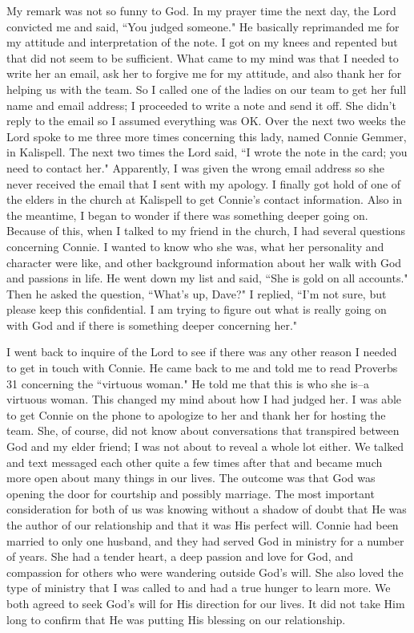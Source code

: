 \documentclass[oneside,12pt]{book}
\begin{document}
My remark was not so funny to God. In my prayer time the next day, the Lord convicted me and said, ``You judged someone." He basically reprimanded me for my attitude and interpretation of the note. I got on my knees and repented but that did not seem to be sufficient. What came to my mind was that I needed to write her an email, ask her to forgive me for my attitude, and also thank her for helping us with the team. So I called one of the ladies on our team to get her full name and email address; I proceeded to write a note and send it off. She didn't reply to the email so I assumed everything was OK. Over the next two weeks the Lord spoke to me three more times concerning this lady, named Connie Gemmer, in Kalispell. The next two times the Lord said, ``I wrote the note in the card; you need to contact her." Apparently, I was given the wrong email address so she never received the email that I sent with my apology. I finally got hold of one of the elders in the church at Kalispell to get Connie's contact information. Also in the meantime, I began to wonder if there was something deeper going on. Because of this, when I talked to my friend in the church, I had several questions concerning Connie. I wanted to know who she was, what her personality and character were like, and other background information about her walk with God and passions in life. He went down my list and said, ``She is gold on all accounts." Then he asked the question, ``What's up, Dave?" I replied, ``I'm not sure, but please keep this confidential. I am trying to figure out what is really going on with God and if there is something deeper concerning her." 

I went back to inquire of the Lord to see if there was any other reason I needed to get in touch with Connie. He came back to me and told me to read Proverbs 31 concerning the ``virtuous woman." He told me that this is who she is--a virtuous woman. This changed my mind about how I had judged her. I was able to get Connie on the phone to apologize to her and thank her for hosting the team. She, of course, did not know about  conversations that transpired between God and my elder friend; I was not about to reveal a whole lot either. We talked and text messaged each other quite a few times after that and became much more open about many things in our lives. The outcome was that God was opening the door for courtship and possibly marriage. The most important consideration for both of us was knowing without a shadow of doubt that He was the author of our relationship and that it was His perfect will. Connie had been married to only one husband, and they had served God in ministry for a number of years. She had a tender heart, a deep passion and love for God, and compassion for others who were wandering outside God's will. She also loved the type of ministry that I was called to and had a true hunger to learn more. We both agreed to seek God's will for His direction for our lives. It did not take Him long to confirm that He was putting His blessing on our relationship. 
\end{document}
